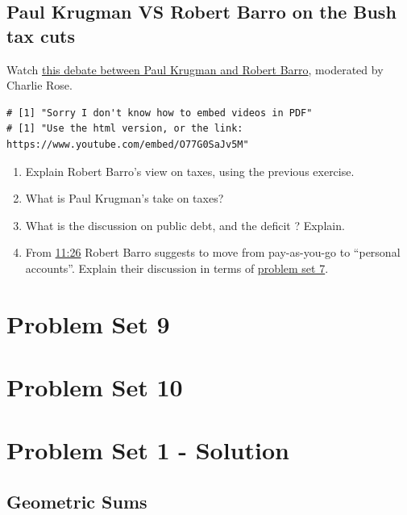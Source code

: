 \documentclass[]{book}
\theoremstyle{definition}
\theoremstyle{definition}
\theoremstyle{definition}
\theoremstyle{remark}
\begin{document}
\section{Paul Krugman VS Robert Barro on the Bush tax
cuts}\label{paul-krugman-vs-robert-barro-on-the-bush-tax-cuts}

Watch \href{https://www.youtube.com/watch?v=O77G0SaJv5M}{this debate
between Paul Krugman and Robert Barro}, moderated by Charlie Rose.

\begin{verbatim}
# [1] "Sorry I don't know how to embed videos in PDF"
# [1] "Use the html version, or the link: https://www.youtube.com/embed/O77G0SaJv5M"
\end{verbatim}

\begin{enumerate}
\def\labelenumi{\arabic{enumi}.}
\item
  Explain Robert Barro's view on taxes, using the previous exercise.
\item
  What is Paul Krugman's take on taxes?
\item
  What is the discussion on public debt, and the deficit ? Explain.
\item
  From \href{https://youtu.be/O77G0SaJv5M?t=686}{11:26} Robert Barro
  suggests to move from pay-as-you-go to ``personal accounts''. Explain
  their discussion in terms of \protect\hyperlink{pset7}{problem set 7}.
\end{enumerate}

\hypertarget{pset9}{\chapter{Problem Set 9}\label{pset9}}

\hypertarget{pset10}{\chapter{Problem Set 10}\label{pset10}}

\hypertarget{pset1-sol}{\chapter{Problem Set 1 -
Solution}\label{pset1-sol}}

\section{Geometric Sums}\label{geometric-sums-1}
\end{document}
